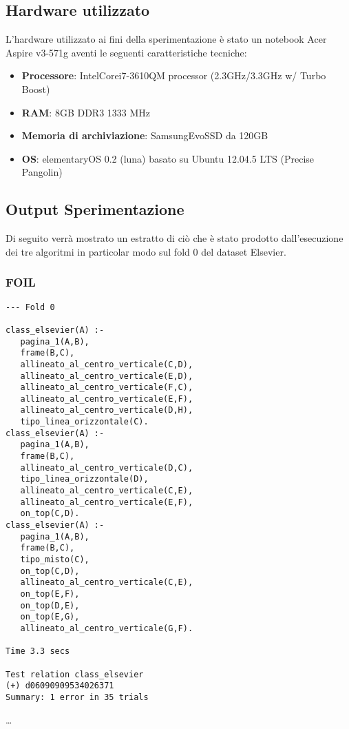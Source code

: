 \subsection{Hardware utilizzato}
\label{hw}
L'hardware utilizzato ai fini della sperimentazione è stato un notebook Acer Aspire v3-571g aventi le seguenti caratteristiche tecniche:
\begin{itemize}
	\item \textbf{Processore}: Intel\textregistered Core\texttrademark  i7-3610QM processor (2.3GHz/3.3GHz w/ Turbo Boost)
	\item \textbf{RAM}: 8GB DDR3 1333 MHz
	\item \textbf{Memoria di archiviazione}: Samsung\textregistered Evo\texttrademark SSD da 120GB 
	\item \textbf{OS}: elementaryOS 0.2 (luna) basato su Ubuntu 12.04.5 LTS (Precise Pangolin)
\end{itemize}

\subsection{Output Sperimentazione}
Di seguito verrà mostrato un estratto di ciò che è stato prodotto dall'esecuzione dei tre algoritmi in particolar modo sul fold 0 del dataset Elsevier.
\subsubsection{FOIL}
\begin{verbatim}
--- Fold 0

class_elsevier(A) :- 
   pagina_1(A,B), 
   frame(B,C), 
   allineato_al_centro_verticale(C,D),
   allineato_al_centro_verticale(E,D), 
   allineato_al_centro_verticale(F,C), 
   allineato_al_centro_verticale(E,F), 
   allineato_al_centro_verticale(D,H), 
   tipo_linea_orizzontale(C).
class_elsevier(A) :- 
   pagina_1(A,B), 
   frame(B,C), 
   allineato_al_centro_verticale(D,C), 
   tipo_linea_orizzontale(D), 
   allineato_al_centro_verticale(C,E), 
   allineato_al_centro_verticale(E,F), 
   on_top(C,D).
class_elsevier(A) :- 
   pagina_1(A,B), 
   frame(B,C), 
   tipo_misto(C), 
   on_top(C,D), 
   allineato_al_centro_verticale(C,E), 
   on_top(E,F), 
   on_top(D,E), 
   on_top(E,G), 
   allineato_al_centro_verticale(G,F).

Time 3.3 secs

Test relation class_elsevier
(+)	d06090909534026371
Summary: 1 error in 35 trials
\end{verbatim}
\dots
